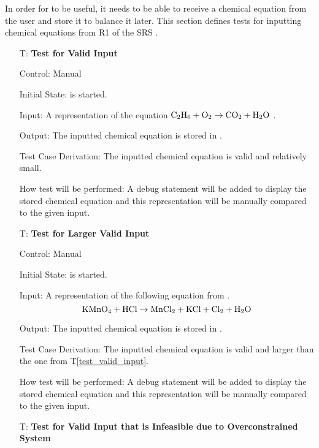\documentclass[12pt, titlepage]{article}
\newcounter{testnum} %
\newcommand{\testref}[1]{T\ref{#1}}
\begin{document}
In order for \progname{} to be useful, it needs to be able to receive a
chemical equation from the user and store it to balance it later. This
section defines tests for inputting chemical equations from R1 of the SRS
. 

\begin{enumerate}

  \item[T\refstepcounter{testnum}\thetestnum \label{test_valid_input}:]
    \textbf{Test for Valid Input}

    Control: Manual

    Initial State: \progname{} is started.

    Input: A representation of the equation
    $\ce{C2H6} + \ce{O2} \rightarrow \ce{CO2} + \ce{H2O}$
    \cite{hamid_balancing_2019}.

    Output: The inputted chemical equation is stored in \progname{}.

    Test Case Derivation: The inputted chemical equation is
    valid and relatively small.

    How test will be performed: A debug statement will be added to display the
    stored chemical equation and this representation will be manually compared to
    the given input.

  \item[T\refstepcounter{testnum}\thetestnum \label{test_larger_valid_input}:]
    \textbf{Test for Larger Valid Input}

    Control: Manual

    Initial State: \progname{} is started.

    Input: A representation of the following equation from
    \cite{taylor_balancing_2021}.
    $$\ce{KMnO4} + \ce{HCl} \rightarrow \ce{MnCl2} + \ce{KCl} + \ce{Cl2} +
      \ce{H2O}$$

    Output: The inputted chemical equation is stored in \progname{}.

    Test Case Derivation: The inputted chemical equation is
    valid and larger than the one from \testref{test_valid_input}.

    How test will be performed: A debug statement will be added to display the
    stored chemical equation and this representation will be manually compared to
    the given input.

  \item[T\refstepcounter{testnum}\thetestnum \label{test_inf_over_valid_input}:]
    \textbf{Test for Valid Input that is Infeasible due to Overconstrained
      System}


\end{enumerate}
\end{document}
